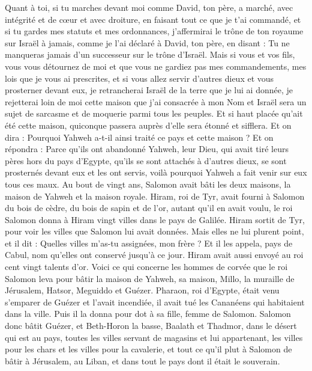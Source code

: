 \begin{multicols}{2}
Quant à toi, si tu marches devant moi comme David, ton père, a marché, avec intégrité et de cœur et avec droiture, en faisant tout ce que je t'ai commandé, et si tu gardes mes statuts et mes ordonnances,
j’affermirai le trône de ton royaume sur Israël à jamais, comme je l’ai déclaré à David, ton père, en disant : Tu ne manqueras jamais d’un successeur sur le trône d'Israël.
Mais si vous et vos fils, vous vous détournez de moi et que vous ne gardiez pas mes commandements, mes lois que je vous ai prescrites, et si vous allez servir d'autres dieux et vous prosterner devant eux,
je retrancherai Israël de la terre que je lui ai donnée, je rejetterai loin de moi cette maison que j'ai consacrée à mon Nom et Israël sera un sujet de sarcasme et de moquerie parmi tous les peuples.
Et si haut placée qu’ait été cette maison, quiconque passera auprès d'elle sera étonné et sifflera. Et on dira : Pourquoi Yahweh a-t-il ainsi traité ce pays et cette maison ?
Et on répondra : Parce qu'ils ont abandonné Yahweh, leur Dieu, qui avait tiré leurs pères hors du pays d'Egypte, qu'ils se sont attachés à d'autres dieux, se sont prosternés devant eux et les ont servis, voilà pourquoi Yahweh a fait venir sur eux tous ces maux.
Au bout de vingt ans, Salomon avait bâti les deux maisons, la maison de Yahweh et la maison royale.
Hiram, roi de Tyr, avait fourni à Salomon du bois de cèdre, du bois de sapin et de l'or, autant qu'il en avait voulu, le roi Salomon donna à Hiram vingt villes dans le pays de Galilée.
Hiram sortit de Tyr, pour voir les villes que Salomon lui avait données. Mais elles ne lui plurent point,
et il dit : Quelles villes m'as-tu assignées, mon frère ? Et il les appela, pays de Cabul, nom qu’elles ont conservé jusqu'à ce jour.
Hiram avait aussi envoyé au roi cent vingt talents d'or.
Voici ce qui concerne les hommes de corvée que le roi Salomon leva pour bâtir la maison de Yahweh, sa maison, Millo, la muraille de Jérusalem, Hatsor, Meguiddo et Guézer.
Pharaon, roi d'Egypte, était venu s’emparer de Guézer et l'avait incendiée, il avait tué les Cananéens qui habitaient dans la ville. Puis il la donna pour dot à sa fille, femme de Salomon.
Salomon donc bâtit Guézer, et Beth-Horon la basse,
Baalath et Thadmor, dans le désert qui est au pays,
toutes les villes servant de magasins et lui appartenant, les villes pour les chars et les villes pour la cavalerie, et tout ce qu’il plut à Salomon de bâtir à Jérusalem, au Liban, et dans tout le pays dont il était le souverain.

\end{multicols}
